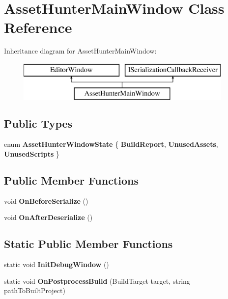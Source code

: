 \hypertarget{class_asset_hunter_main_window}{}\section{Asset\+Hunter\+Main\+Window Class Reference}
\label{class_asset_hunter_main_window}
Inheritance diagram for Asset\+Hunter\+Main\+Window\+:\begin{figure}[H]
\begin{center}
\leavevmode
\includegraphics[height=2.000000cm]{class_asset_hunter_main_window}
\end{center}
\end{figure}
\subsection*{Public Types}
\begin{DoxyCompactItemize}
\item 
\mbox{\label{class_asset_hunter_main_window_ab87f937b4cee5228d9bd3a90f9c47c96}} 
enum {\bfseries Asset\+Hunter\+Window\+State} \{ {\bfseries Build\+Report}, 
{\bfseries Unused\+Assets}, 
{\bfseries Unused\+Scripts}
 \}
\end{DoxyCompactItemize}
\subsection*{Public Member Functions}
\begin{DoxyCompactItemize}
\item 
\mbox{\label{class_asset_hunter_main_window_a22a49a2644d2e67f779ee1875b169397}} 
void {\bfseries On\+Before\+Serialize} ()
\item 
\mbox{\label{class_asset_hunter_main_window_a9d255f95cee3f5885dc46f8984d251cc}} 
void {\bfseries On\+After\+Deserialize} ()
\end{DoxyCompactItemize}
\subsection*{Static Public Member Functions}
\begin{DoxyCompactItemize}
\item 
\mbox{\label{class_asset_hunter_main_window_a08b93c3d3b30a0ba73defbf65b1d4287}} 
static void {\bfseries Init\+Debug\+Window} ()
\item 
\mbox{\label{class_asset_hunter_main_window_a1e271288c954a43ab277d67ddcb2362d}} 
static void {\bfseries On\+Postprocess\+Build} (Build\+Target target, string path\+To\+Built\+Project)
\end{DoxyCompactItemize}
